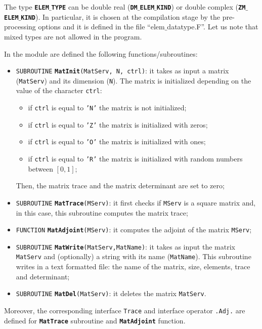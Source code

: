 \documentclass[rmp,10pt,onecolumn,fleqn,notitlepage]{revtex4-1}
\begin{document}
The type {\bfseries\texttt{ELEM}$\_$\texttt{TYPE}} can be double real ({\bfseries\texttt{DM}$\_$\texttt{ELEM}$\_$\texttt{KIND}}) or double complex ({\bfseries\texttt{ZM}$\_$\texttt{ELEM}$\_$\texttt{KIND}}). In particular, it is chosen at the compilation stage by the pre-processing options and it is defined in the file “elem$\_$datatype.F”. Let us note that mixed types are not allowed in the program.

\clearpage

In the module are defined the following functions/subroutines:
\begin{itemize}
\item \texttt{SUBROUTINE} {\bfseries\texttt{MatInit}}\texttt{(MatServ, N, ctrl)}: it takes as input a matrix (\texttt{MatServ}) and its dimension (\texttt{N}). The matrix is initialized depending on the value of the character \texttt{ctrl}:

 \begin{itemize}
 \item if \texttt{ctrl} is equal to \texttt{'N'} the matrix is not initialized;
 \item if \texttt{ctrl} is equal to \texttt{'Z'} the matrix is initialized with zeros;
 \item if \texttt{ctrl} is equal to \texttt{'O'} the matrix is initialized with ones;
 \item if \texttt{ctrl} is equal to \texttt{'R'} the matrix is initialized with random numbers between \( [0,1] \);
 \end{itemize}
 Then, the matrix trace and the matrix determinant are set to zero;

\item \texttt{SUBROUTINE} {\bfseries\texttt{MatTrace}}\texttt{(MServ)}: it first checks if \texttt{MServ} is a square matrix and, in this case, this subroutine computes the matrix trace;

\item \texttt{FUNCTION} {\bfseries\texttt{MatAdjoint}}\texttt{(MServ)}: it computes the adjoint of the matrix \texttt{MServ};

\item \texttt{SUBROUTINE} {\bfseries\texttt{MatWrite}}\texttt{(MatServ,MatName)}: it takes as input the matrix \texttt{MatServ} and (optionally) a string with its name (\texttt{MatName}). This subroutine writes in a text formatted file: the name of the matrix, size, elements, trace and determinant;

\item \texttt{SUBROUTINE} {\bfseries\texttt{MatDel}}\texttt{(MatServ)}: it deletes the matrix \texttt{MatServ}.

\end{itemize}
Moreover, the corresponding interface \texttt{Trace} and interface operator \texttt{.Adj.} are defined for {\bfseries\texttt{MatTrace}} subroutine and {\bfseries\texttt{MatAdjoint}} function.
\end{document}
